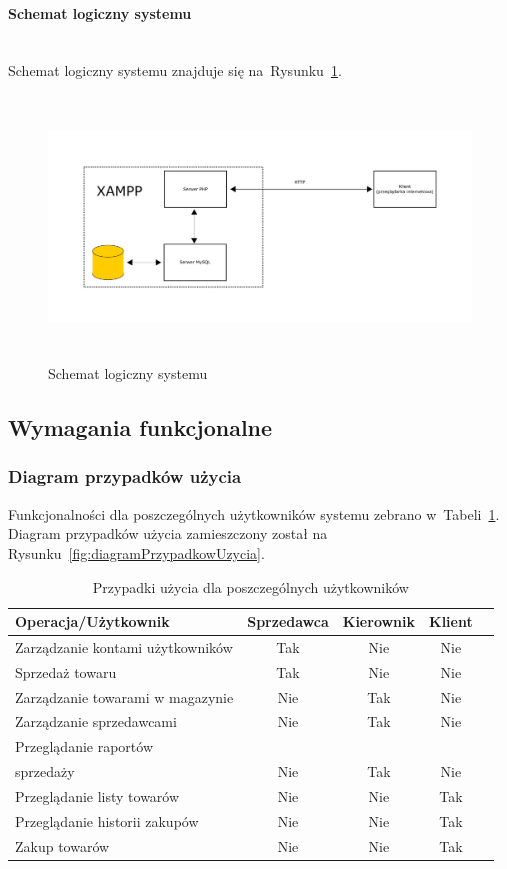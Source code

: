 \documentclass[a4paper, 12pt]{article}
\begin{document}
\paragraph{Schemat logiczny systemu} \mbox{}\\
Schemat logiczny systemu znajduje się na~Rysunku~\ref{fig:schematLogiczny}.

\begin{figure}[H]
	\includegraphics[height=7cm]{schemat.png}
	\caption[Schemat logiczny systemu]{Schemat logiczny systemu}
	\label{fig:schematLogiczny}
\end{figure}

\subsection{Wymagania funkcjonalne}
\subsubsection{Diagram przypadków użycia}
Funkcjonalności dla poszczególnych użytkowników systemu zebrano w~Tabeli~\ref{tab:tabelaPrzypadkowUzycia}.
Diagram przypadków użycia zamieszczony został na Rysunku~\ref{fig:diagramPrzypadkowUzycia}.

\begin{table}[H]
	\centering
	\caption[Tabela przypadków użycia]{Przypadki użycia dla poszczególnych użytkowników}
	\label{tab:tabelaPrzypadkowUzycia}
		\begin{tabular}{ l c c c c }
			Operacja/Użytkownik & Sprzedawca & Kierownik & Klient \\ \hline
			Zarządzanie kontami użytkowników & Tak & Nie & Nie \\ \hline
			Sprzedaż towaru & Tak & Nie & Nie \\ \hline
			Zarządzanie towarami w magazynie & Nie & Tak & Nie \\ \hline
			Zarządzanie sprzedawcami & Nie & Tak & Nie \\ \hline
			Przeglądanie raportów\\ sprzedaży & Nie & Tak & Nie \\ \hline
			Przeglądanie listy towarów & Nie & Nie & Tak \\ \hline
			Przeglądanie historii zakupów & Nie & Nie & Tak \\ \hline
			Zakup towarów & Nie & Nie & Tak \\ \hline
		\end{tabular}
\end{table}
\end{document}
